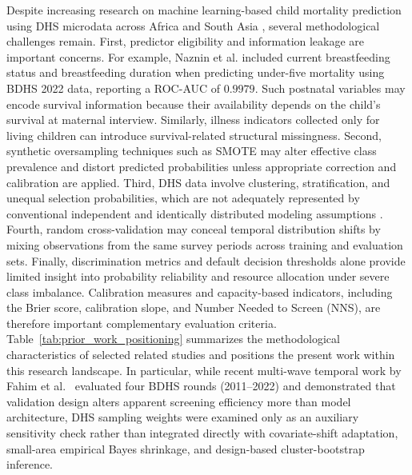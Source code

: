 \documentclass[a4paper,fleqn]{cas-sc}
\begin{document}
Despite increasing research on machine learning-based child mortality prediction using DHS microdata across Africa and South Asia \cite{oduse2024,naznin2025,mabula2025,bitew2020,saroj2022,asmare2026,fahim2026}, several methodological challenges remain. First, predictor eligibility and information leakage are important concerns. For example, Naznin et al. \cite{naznin2025} included current breastfeeding status and breastfeeding duration when predicting under-five mortality using BDHS 2022 data, reporting a ROC-AUC of $0.9979$. Such postnatal variables may encode survival information because their availability depends on the child's survival at maternal interview. Similarly, illness indicators collected only for living children can introduce survival-related structural missingness. Second, synthetic oversampling techniques such as SMOTE \cite{chawla2002} may alter effective class prevalence and distort predicted probabilities unless appropriate correction and calibration are applied. Third, DHS data involve clustering, stratification, and unequal selection probabilities, which are not adequately represented by conventional independent and identically distributed modeling assumptions \cite{macnell2023,lumley2004,oh2026}. Fourth, random cross-validation may conceal temporal distribution shifts by mixing observations from the same survey periods across training and evaluation sets. Finally, discrimination metrics and default decision thresholds alone provide limited insight into probability reliability and resource allocation under severe class imbalance. Calibration measures and capacity-based indicators, including the Brier score, calibration slope, and Number Needed to Screen (NNS), are therefore important complementary evaluation criteria. Table~\ref{tab:prior_work_positioning} summarizes the methodological characteristics of selected related studies and positions the present work within this research landscape. In particular, while recent multi-wave temporal work by Fahim et al.~\cite{fahim2026} evaluated four BDHS rounds (2011--2022) and demonstrated that validation design alters apparent screening efficiency more than model architecture, DHS sampling weights were examined only as an auxiliary sensitivity check rather than integrated directly with covariate-shift adaptation, small-area empirical Bayes shrinkage, and design-based cluster-bootstrap inference.
\end{document}

